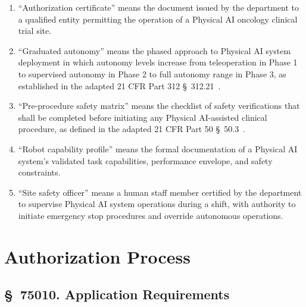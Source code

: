 \begin{enumerate}[label=(\alph*)]
\item ``Authorization certificate'' means the document issued by the department
  to a qualified entity permitting the operation of a Physical AI oncology
  clinical trial site.

\item ``Graduated autonomy'' means the phased approach to Physical AI system
  deployment in which autonomy levels increase from teleoperation in Phase 1
  to supervised autonomy in Phase 2 to full autonomy range in Phase 3, as
  established in the adapted 21 CFR Part 312 \S~312.21~\cite{cfr312adapt}.

\item ``Pre-procedure safety matrix'' means the checklist of safety
  verifications that shall be completed before initiating any Physical
  AI-assisted clinical procedure, as defined in the adapted 21 CFR Part 50
  \S~50.3~\cite{cfr50adapt}.

\item ``Robot capability profile'' means the formal documentation of a Physical
  AI system's validated task capabilities, performance envelope, and safety
  constraints.

\item ``Site safety officer'' means a human staff member certified by the
  department to supervise Physical AI system operations during a shift, with
  authority to initiate emergency stop procedures and override autonomous
  operations.
\end{enumerate}

\section{Authorization Process}

\subsection{\S~75010. Application Requirements}

